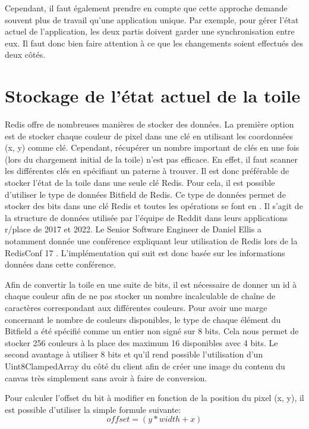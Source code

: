 Cependant, il faut également prendre en compte que cette approche demande souvent plus de travail qu'une application unique. Par exemple, pour gérer l'état actuel de l'application, les deux partis doivent garder une synchronisation entre eux. Il faut donc bien faire attention à ce que les changements soient effectués des deux côtés.

\section{Stockage de l'état actuel de la toile}
\label{section:stockage}

Redis offre de nombreuses manières de stocker des données. La première option est de stocker chaque couleur de pixel dans une clé en utilisant les coordonnées (x, y) comme clé. Cependant, récupérer un nombre important de clés en une fois (lors du chargement initial de la toile) n'est pas efficace. En effet, il faut scanner les différentes clés en spécifiant un paterne à trouver. Il est donc préférable de stocker l'état de la toile dans une seule clé Redis. Pour cela, il est possible d'utiliser le type de données Bitfield \cite{bitfield} de Redis. Ce type de données permet de stocker des bits dans une clé Redis et toutes les opérations se font en . Il s'agit de la structure de données utilisée par l'équipe de Reddit dans leurs applications r/place de 2017 et 2022. Le Senior Software Engineer de Daniel Ellis a notamment donnée une conférence expliquant leur utilisation de Redis lors de la RedisConf 17 \cite{redisconf}. L'implémentation qui suit est donc basée sur les informations données dans cette conférence.

Afin de convertir la toile en une suite de bits, il est nécessaire de donner un id à chaque couleur afin de ne pas stocker un nombre incalculable de chaîne de caractères correspondant aux différentes couleurs. Pour avoir une marge concernant le nombre de couleurs disponibles, le type de chaque élément du Bitfield a été spécifié comme un entier non signé sur 8 bits. Cela nous permet de stocker 256 couleurs à la place des maximum 16 disponibles avec 4 bits. Le second avantage à utiliser 8 bits et qu'il rend possible l'utilisation d'un Uint8ClampedArray \cite{uint8clampedarray} du côté du client afin de créer une image du contenu du canvas très simplement sans avoir à faire de conversion.

Pour calculer l'offset du bit à modifier en fonction de la position du pixel (x, y), il est possible d'utiliser la simple formule suivante:
\begin{equation}
  offset = (y * width + x)
\end{equation}

